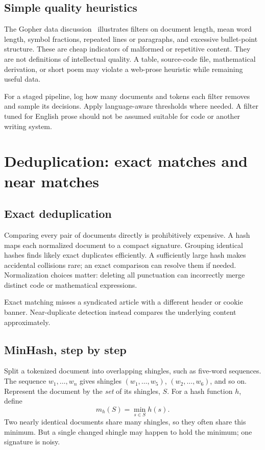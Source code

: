 \subsection{Simple quality heuristics}
The Gopher data discussion~\cite{gopher} illustrates filters on document length, mean word length, symbol fractions, repeated lines or paragraphs, and excessive bullet-point structure. These are cheap indicators of malformed or repetitive content. They are not definitions of intellectual quality. A table, source-code file, mathematical derivation, or short poem may violate a web-prose heuristic while remaining useful data.

For a staged pipeline, log how many documents and tokens each filter removes and sample its decisions. Apply language-aware thresholds where needed. A filter tuned for English prose should not be assumed suitable for code or another writing system.

\section{Deduplication: exact matches and near matches}
\subsection{Exact deduplication}
Comparing every pair of documents directly is prohibitively expensive. A hash maps each normalized document to a compact signature. Grouping identical hashes finds likely exact duplicates efficiently. A sufficiently large hash makes accidental collisions rare; an exact comparison can resolve them if needed. Normalization choices matter: deleting all punctuation can incorrectly merge distinct code or mathematical expressions.

Exact matching misses a syndicated article with a different header or cookie banner. Near-duplicate detection instead compares the underlying content approximately.

\subsection{MinHash, step by step}
Split a tokenized document into overlapping shingles, such as five-word sequences. The sequence $w_1,\ldots,w_n$ gives shingles $(w_1,\ldots,w_5)$, $(w_2,\ldots,w_6)$, and so on. Represent the document by the \emph{set} of its shingles, $S$. For a hash function $h$, define
\[
m_h(S)=\min_{s\in S}h(s).
\]
Two nearly identical documents share many shingles, so they often share this minimum. But a single changed shingle may happen to hold the minimum; one signature is noisy.

